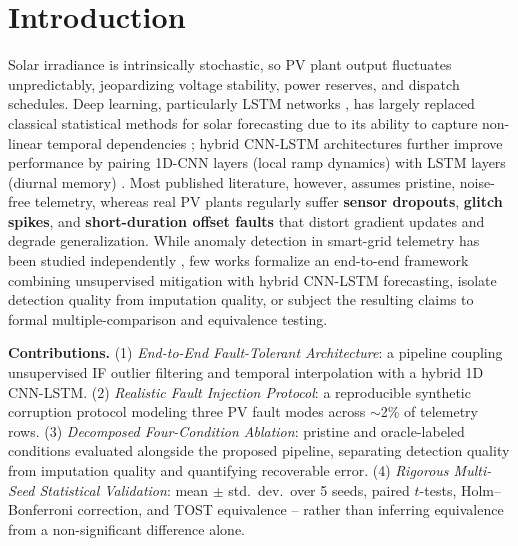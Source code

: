 \documentclass[runningheads]{llncs}
\begin{document}
\section{Introduction}
Solar irradiance is intrinsically stochastic, so PV plant output fluctuates unpredictably, jeopardizing voltage stability, power reserves, and dispatch schedules. Deep learning, particularly LSTM networks \cite{ref1}, has largely replaced classical statistical methods for solar forecasting due to its ability to capture non-linear temporal dependencies \cite{ref2,ref3}; hybrid CNN-LSTM architectures further improve performance by pairing 1D-CNN layers (local ramp dynamics) with LSTM layers (diurnal memory) \cite{ref4,ref5,ref6,ref7}. Most published literature, however, assumes pristine, noise-free telemetry, whereas real PV plants regularly suffer \textbf{sensor dropouts}, \textbf{glitch spikes}, and \textbf{short-duration offset faults} that distort gradient updates and degrade generalization. While anomaly detection in smart-grid telemetry has been studied independently \cite{ref8}, few works formalize an end-to-end framework combining unsupervised mitigation with hybrid CNN-LSTM forecasting, isolate detection quality from imputation quality, or subject the resulting claims to formal multiple-comparison and equivalence testing.

\noindent\textbf{Contributions.} (1) \emph{End-to-End Fault-Tolerant Architecture}: a pipeline coupling unsupervised IF outlier filtering and temporal interpolation with a hybrid 1D CNN-LSTM. (2) \emph{Realistic Fault Injection Protocol}: a reproducible synthetic corruption protocol modeling three PV fault modes across $\sim$2\% of telemetry rows. (3) \emph{Decomposed Four-Condition Ablation}: pristine and oracle-labeled conditions evaluated alongside the proposed pipeline, separating detection quality from imputation quality and quantifying recoverable error. (4) \emph{Rigorous Multi-Seed Statistical Validation}: mean $\pm$ std.\ dev.\ over 5 seeds, paired $t$-tests, Holm--Bonferroni correction, and TOST equivalence -- rather than inferring equivalence from a non-significant difference alone.
\end{document}
